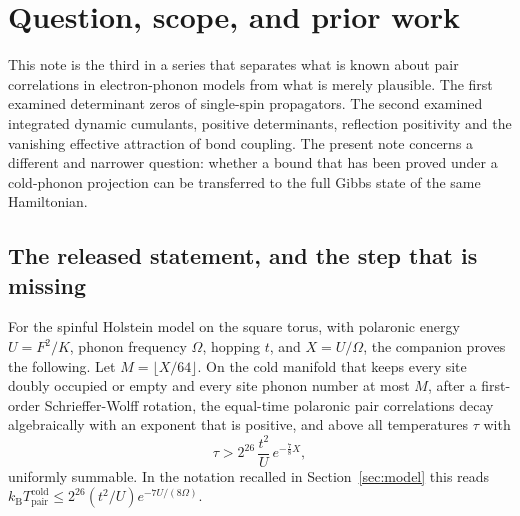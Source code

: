 \documentclass[11pt]{article}
\theoremstyle{definition}
\theoremstyle{remark}
\newcommand{\Tcold}{T_{\mathrm{pair}}^{\mathrm{cold}}}
\begin{document}
\begin{abstract}
different constant. The channel weight of a first-order virtual transfer tends
to $1/4$ both in the bare frame and after the first Schrieffer-Wolff rotation
used in the cold-projected proof, so that rotation removes the electronic gap
from the denominator and leaves the virtual cloud intact. Fourth, the same wall
appears in the charge-order problem: the strong-coupling pseudospin theory of the
same model is a known easy-axis model, and the first full-Fock transform, an
explicit local frequency window and a fixed-history trace bound are supplied
here, but positive-temperature charge order remains open at a decorated-contour
lemma that the nearest rigorous theorem cannot supply. The open problem for the
ceiling is a normalized charged-skeleton influence bound, stated here precisely.
No pairing ceiling, and no bound on any critical temperature, is proved or
disproved.
\end{abstract}

\section{Question, scope, and prior work}

This note is the third in a series that separates what is known about pair
correlations in electron-phonon models from what is merely plausible. The first
\cite{barriers1} examined determinant zeros of single-spin propagators. The
second \cite{barriers2} examined integrated dynamic cumulants,
positive determinants, reflection positivity and the vanishing effective
attraction of bond coupling. The present note concerns a different and narrower
question: whether a bound that has been proved under a cold-phonon projection can
be transferred to the full Gibbs state of the same Hamiltonian.

\subsection{The released statement, and the step that is missing}

For the spinful Holstein model on the square torus, with polaronic energy
$U=F^{2}/K$, phonon frequency $\Omega$, hopping $t$, and $X=U/\Omega$, the
companion \cite{largeu} proves the following. Let
$M=\lfloor X/64\rfloor$. On the cold manifold that keeps every site doubly
occupied or empty and every site phonon number at most $M$, after a
first-order Schrieffer-Wolff rotation, the equal-time polaronic pair correlations
decay algebraically with an exponent that is positive, and above all temperatures
$\tau$ with
\begin{equation}
\tau>2^{26}\,\frac{t^{2}}{U}\,e^{-\frac{7}{8}X},
\label{eq:coldceiling}
\end{equation}
uniformly summable. In the notation recalled in Section~\ref{sec:model} this
reads $k_{\mathrm{B}}\Tcold\le 2^{26}(t^{2}/U)e^{-7U/(8\Omega)}$.
\end{document}
